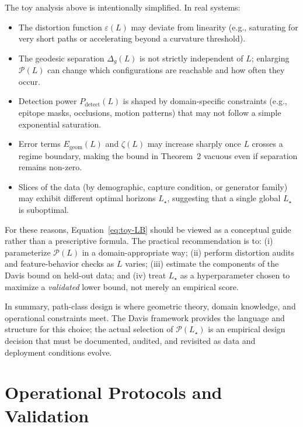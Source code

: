 \documentclass[11pt]{article}
\theoremstyle{remark}
\theoremstyle{plain}
\begin{document}
The toy analysis above is intentionally simplified. In real systems:

\begin{itemize}[leftmargin=*]
  \item The distortion function $\varepsilon(L)$ may deviate from linearity (e.g., saturating for very
  short paths or accelerating beyond a curvature threshold).

  \item The geodesic separation $\Delta_g(L)$ is not strictly independent of $L$; enlarging
  $\mathcal{P}(L)$ can change which configurations are reachable and how often they occur.

  \item Detection power $P_{\mathrm{detect}}(L)$ is shaped by domain-specific constraints (e.g.,
  epitope masks, occlusions, motion patterns) that may not follow a simple exponential saturation.

  \item Error terms $E_{\mathrm{geom}}(L)$ and $\zeta(L)$ may increase sharply once $L$ crosses a
  regime boundary, making the bound in Theorem~2 vacuous even if separation remains non-zero.

  \item Slices of the data (by demographic, capture condition, or generator family) may exhibit
  different optimal horizons $L_\star$, suggesting that a single global $L_\star$ is suboptimal.
\end{itemize}

For these reasons, Equation~\eqref{eq:toy-LB} should be viewed as a conceptual guide rather than a
prescriptive formula. The practical recommendation is to: (i) parameterize $\mathcal{P}(L)$ in a
domain-appropriate way; (ii) perform distortion audits and feature-behavior checks as $L$ varies;
(iii) estimate the components of the Davis bound on held-out data; and (iv) treat $L_\star$ as a
hyperparameter chosen to maximize a \emph{validated} lower bound, not merely an empirical score.

In summary, path-class design is where geometric theory, domain knowledge, and operational
constraints meet. The Davis framework provides the language and structure for this choice; the
actual selection of $\mathcal{P}(L_\star)$ is an empirical design decision that must be documented,
audited, and revisited as data and deployment conditions evolve.

\section{Operational Protocols and Validation}
\label{sec:ops}
\label{sec:ops-protocols}
\end{document}
